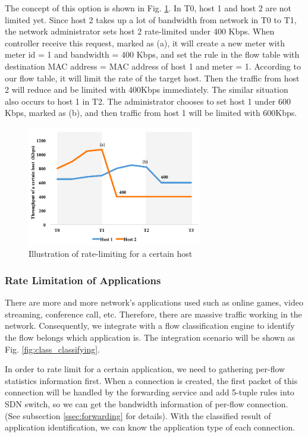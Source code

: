 \documentclass[journal]{IEEEtran}
\begin{document}
The concept of this option is shown in Fig. \ref{fig:mft_qos_rate_host}. In T0, host 1 and host 2 are not limited yet. Since host 2 takes up a lot of bandwidth from network in T0 to T1, the network administrator sets host 2 rate-limited under 400 Kbps. When controller receive this request, marked as (a), it will create a new meter with meter id = 1 and bandwidth = 400 Kbps, and set the rule in the flow table with destination MAC address = MAC address of host 1 and meter = 1. According to our flow table, it will limit the rate of the target host. Then the traffic from host 2 will reduce and be limited with 400Kbps immediately. The similar situation also occurs to host 1 in T2. The administrator chooses to set host 1 under 600 Kbps, marked as (b), and then traffic from host 1 will be limited with 600Kbps.


\begin{figure}[!t]
\centering
\includegraphics[width=3in]{./figures/mft_qos_rate_host}
\caption{Illustration of rate-limiting for a certain host}
\label{fig:mft_qos_rate_host}
\end{figure}


\subsubsection{Rate Limitation of Applications}
There are more and more network’s applications used such as online games, video streaming, conference call, etc. Therefore, there are massive traffic working in the network. Consequently, we integrate with a flow classification engine to identify the flow belongs which application is. The integration scenario will be shown as Fig. \ref{fig:class_classifying}.


In order to rate limit for a certain application, we need to gathering per-flow statistics information first. When
a connection is created, the first packet of this connection will be handled by the forwarding service and add 5-tuple rules into SDN switch, so we can get the bandwidth information of per-flow connection. (See subsection \ref{ssec:forwarding} for details). With the classified result of application identification, we can know the application type of each connection.
\end{document}
